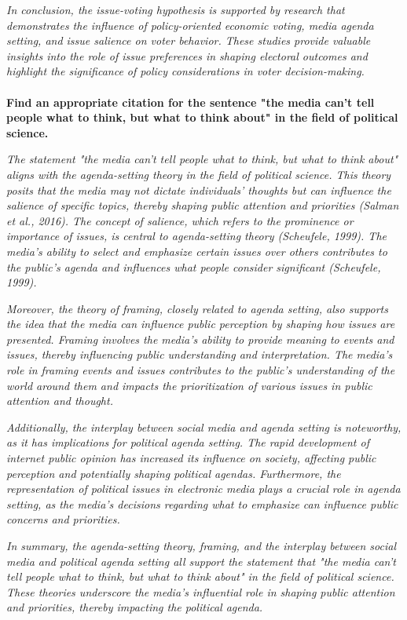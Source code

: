 \documentclass[11pt,a4paper]{article}
\begin{document}
 \textit{In conclusion, the issue-voting hypothesis is supported by research that demonstrates the influence of policy-oriented economic voting, media agenda setting, and issue salience on voter behavior. These studies provide valuable insights into the role of issue preferences in shaping electoral outcomes and highlight the significance of policy considerations in voter decision-making.}
\\
\\
 \textbf{Find an appropriate citation for the sentence "the media can't tell people what to think, but what to think about" in the field of political science.}

\textit{The statement "the media can't tell people what to think, but what to think about" aligns with the agenda-setting theory in the field of political science. This theory posits that the media may not dictate individuals' thoughts but can influence the salience of specific topics, thereby shaping public attention and priorities (Salman et al., 2016). The concept of salience, which refers to the prominence or importance of issues, is central to agenda-setting theory (Scheufele, 1999). The media's ability to select and emphasize certain issues over others contributes to the public's agenda and influences what people consider significant (Scheufele, 1999).}

 \textit{Moreover, the theory of framing, closely related to agenda setting, also supports the idea that the media can influence public perception by shaping how issues are presented. Framing involves the media's ability to provide meaning to events and issues, thereby influencing public understanding and interpretation. The media's role in framing events and issues contributes to the public's understanding of the world around them and impacts the prioritization of various issues in public attention and thought.}

 \textit{Additionally, the interplay between social media and agenda setting is noteworthy, as it has implications for political agenda setting. The rapid development of internet public opinion has increased its influence on society, affecting public perception and potentially shaping political agendas. Furthermore, the representation of political issues in electronic media plays a crucial role in agenda setting, as the media's decisions regarding what to emphasize can influence public concerns and priorities.}

 \textit{In summary, the agenda-setting theory, framing, and the interplay between social media and political agenda setting all support the statement that "the media can't tell people what to think, but what to think about" in the field of political science. These theories underscore the media's influential role in shaping public attention and priorities, thereby impacting the political agenda.}
\end{document}
